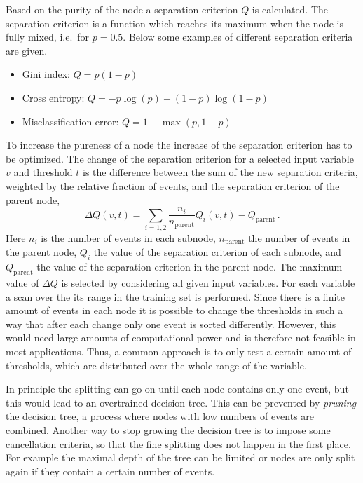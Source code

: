 Based on the purity of the node a separation criterion $Q$ is calculated.
The separation criterion is a function which reaches its maximum when the node is fully mixed, i.e.\ for $p = 0.5$.
Below some examples of different separation criteria are given.
\begin{itemize}
    \item Gini index: $Q = p (1-p)$
    \item Cross entropy: $Q = -p  \log(p) - (1 - p) \log (1 - p)$
    \item Misclassification error: $Q = 1 - \max (p, 1 - p)$
\end{itemize}
To increase the pureness of a node the increase of the separation criterion has to be optimized.
The change of the separation criterion for a selected input variable $v$ and threshold $t$
is the difference between the sum of the new separation criteria, weighted
by the relative fraction of events, and the separation criterion of the parent node,
\begin{equation}
    \Delta Q(v, t) = \sum_{i=1,2} \frac{n_i}{n_\text{parent}} Q_i (v, t) - Q_\text{parent} \,.
\end{equation}
Here $n_i$ is the number of events in each subnode, $n_\text{parent}$ the number of events in the parent node,
$Q_i$ the value of the separation criterion of each subnode, and $Q_\text{parent}$ the value of the separation criterion
in the parent node.
The maximum value of $\Delta Q$ is selected by considering all given input variables.
For each variable a scan over the its range in the training set is performed.
Since there is a finite amount of events in each node it is possible to change the thresholds in such a way that after
each change only one event is sorted differently.
However, this would need large amounts of computational power and is therefore not feasible in most applications.
Thus, a common approach is to only test a certain amount of thresholds, which are distributed over the whole range
of the variable.

In principle the splitting can go on until each node contains only one event, but this would lead
to an overtrained decision tree.
This can be prevented by \emph{pruning} the decision tree, a process where nodes with low numbers of events are combined.
Another way to stop growing the decision tree is to impose some cancellation criteria, so that the fine splitting
does not happen in the first place.
For example the maximal depth of the tree can be limited or nodes are only split again if they
contain a certain number of events.

